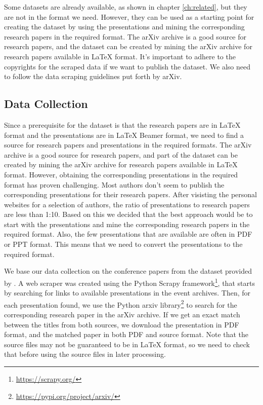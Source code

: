 Some datasets are already available, as shown in chapter \ref{ch:related}, but they are not in the format we need. However, they can be used as a starting point for creating the dataset by using the presentations and mining the corresponding research papers in the required format. The arXiv archive is a good source for research papers, and the dataset can be created by mining the arXiv archive for research papers available in \LaTeX{} format. It's important to adhere to the copyrights for the scraped data if we want to publish the dataset. We also need to follow the data scraping guidelines put forth by arXiv.

\subsection{Data Collection}
Since a prerequisite for the dataset is that the research papers are in \LaTeX{} format and the presentations are in \LaTeX{} Beamer format, we need to find a source for research papers and presentations in the required formats. The arXiv archive is a good source for research papers, and part of the dataset can be created by mining the arXiv archive for research papers available in \LaTeX{} format. However, obtaining the corresponding presentations in the required format has proven challenging. Most authors don't seem to publish the corresponding presentations for their research papers. After visisting the personal websites for a selection of authors, the ratio of presentations to research papers are less than 1:10. Based on this we decided that the best approach would be to start with the presentations and mine the corresponding research papers in the required format. Also, the few presentations that are available are often in PDF or PPT format. This means that we need to convert the presentations to the required format. 

We base our data collection on the conference papers from the dataset provided by \citet{Fu:2022:AAAI}. A web scraper was created using the Python Scrapy framework\footnote{\url{https://scrapy.org/}}, that starts by searching for links to available presentations in the event archives. Then, for each presentation found, we use the Python arxiv library\footnote{\url{https://pypi.org/project/arxiv/}} to search for the corresponding research paper in the arXiv archive. If we get an exact match between the titles from both sources, we download the presentation in PDF format, and the matched paper in both PDF and source format. Note that the source files may not be guaranteed to be in \LaTeX{} format, so we need to check that before using the source files in later processing.

